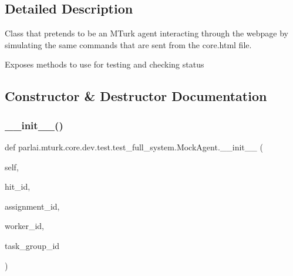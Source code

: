 \subsection{Detailed Description}
\begin{DoxyVerb}Class that pretends to be an MTurk agent interacting through the webpage by
simulating the same commands that are sent from the core.html file.

Exposes methods to use for testing and checking status
\end{DoxyVerb}
 

\subsection{Constructor \& Destructor Documentation}
\mbox{\label{classparlai_1_1mturk_1_1core_1_1dev_1_1test_1_1test__full__system_1_1MockAgent_ae2c5906fb77600feb2d4c8d1ede4e415}} 
\subsubsection{\texorpdfstring{\+\_\+\+\_\+init\+\_\+\+\_\+()}{\_\_init\_\_()}}
{\footnotesize\ttfamily def parlai.\+mturk.\+core.\+dev.\+test.\+test\+\_\+full\+\_\+system.\+Mock\+Agent.\+\_\+\+\_\+init\+\_\+\+\_\+ (\begin{DoxyParamCaption}\item[{}]{self,  }\item[{}]{hit\+\_\+id,  }\item[{}]{assignment\+\_\+id,  }\item[{}]{worker\+\_\+id,  }\item[{}]{task\+\_\+group\+\_\+id }\end{DoxyParamCaption})}




